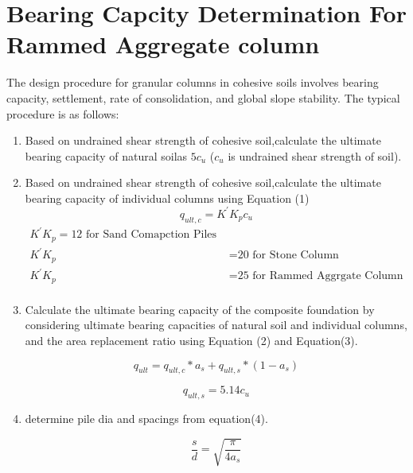 \documentclass[12pt]{article}
\begin{document}

\section{Bearing Capcity Determination For Rammed Aggregate column}
The design procedure for granular columns in cohesive soils involves bearing capacity, settlement, rate of consolidation, and global slope stability. The typical procedure is as follows:
\begin{enumerate}
\item Based on undrained shear strength of cohesive soil,calculate the ultimate bearing capacity of natural soilas $5c_u$ ($c_u$ is undrained shear strength of soil).

\item Based on undrained shear strength of cohesive soil,calculate the ultimate bearing capacity of individual columns using Equation (1) 
\begin{equation}
q_{ult,c}=K^{'}K_{p}c_u
\end{equation}
\begin{equation*}
\begin{align}


K^{'}K_{p}=\text{12 for Sand Comapction Piles }\\
K^{'}K_{p}&=\text{20 for Stone Column}\\
K^{'}K_{p}&=\text{25 for Rammed Aggrgate Column} \\
\end{align}
\end{equation*}




\item Calculate the ultimate bearing capacity of the composite foundation by considering ultimate bearing capacities of natural soil and individual columns, and the area replacement ratio using Equation (2) and Equation(3).

\begin{equation}
q_{ult}=q_{ult,c}*a_{s}+q_{ult,s}*(1-a_{s})
\end{equation}

\begin{equation}
q_{ult,s}=5.14c_{u}
\end{equation}
\item determine pile dia and spacings from equation(4).

\begin{equation}
\frac{s}{d}=\sqrt{\frac{\pi}{4a_s}}
\end{equation}

\end{enumerate}
\end{document}
